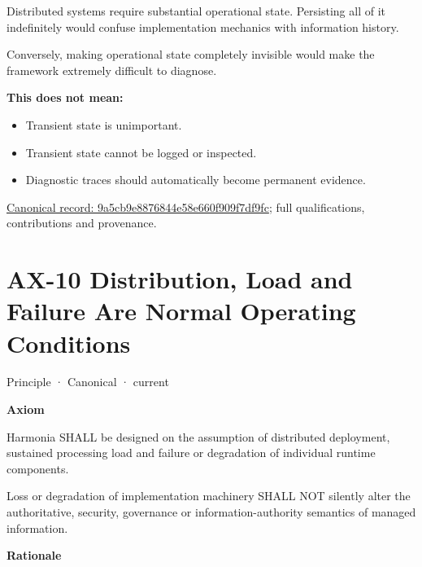 Distributed systems require substantial operational state. Persisting
all of it indefinitely would confuse implementation mechanics with
information history.



Conversely, making operational state completely invisible would make the
framework extremely difficult to diagnose.



\textbf{This does not mean:}



\begin{itemize}


\item Transient state is unimportant.

\item Transient state cannot be logged or inspected.

\item Diagnostic traces should automatically become permanent evidence.

\end{itemize}

{\footnotesize \href{../../../../continuum/motivation/principle/9a5cb9e8876844e58e660f909f7df9fc.md}{Canonical record: 9a5cb9e8876844e58e660f909f7df9fc}; full qualifications, contributions and provenance.}\par
\section{AX-10 Distribution, Load and Failure Are Normal Operating Conditions}

\label{element:0d9673833eb840eab03804aa076c1b0c}
{\small Principle · Canonical · current}\par

\par\medskip\textbf{Axiom}\par


Harmonia SHALL be designed on the assumption of distributed deployment,
sustained processing load and failure or degradation of individual
runtime components.



Loss or degradation of implementation machinery SHALL NOT silently alter
the authoritative, security, governance or information-authority
semantics of managed information.



\par\medskip\textbf{Rationale}\par


